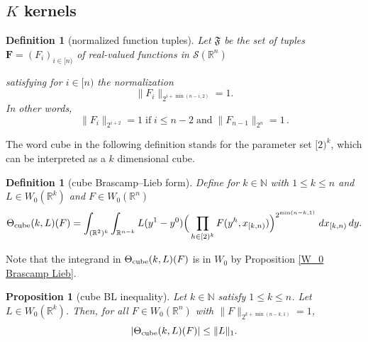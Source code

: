 \documentclass[12pt,reqno]{amsart}
\theoremstyle{plain}
\newtheorem{proposition}[theorem]{Proposition}
\newtheorem{definition}[theorem]{Definition}
\numberwithin{equation}{section}
\theoremstyle{remark}
\newcommand{\R}{{\mathbb R}}
\newcommand{\N}{{\mathbb N}}
\newcommand{\F}{\mathbf{F}}
\begin{document}
\subsection{\texorpdfstring{$K$ kernels}{K kernels}}


\begin{definition}[normalized function tuples]\label{normalized function tuples}
 Let $\mathfrak{F}$ be the set of tuples
$\F=(F_i)_{i\in [n)}$ of real-valued functions in $\mathcal{S}(\R^n)$


satisfying for $i\in [n)$ the normalization
 \begin{equation}\label{auto:normalized-function-tuple} \|F_{i}\|_{2^{i+\min(n-i,2)}}=1. \end{equation}
In other words,
 \begin{equation}\label{f-normalization}
  \|F_{i}\|_{2^{i+2}}=1\;\text{if}\;i\le n-2\;\text{and}\;\|F_{n-1}\|_{2^{n}}=1  \, .
 \end{equation}

\end{definition}


The word cube in the following definition stands for the parameter set $[2)^k$, which can be interpreted as a $k$ dimensional cube.

\begin{definition}[cube Brascamp--Lieb form]\label{cube Brascamp--Lieb}
Define for $k\in\N$ with $1 \le k\le  n$
and  $L\in W_0(\R^k)$ and $F\in W_0(\R^n)$
\begin{equation}\label{auto:cube-Brascamp-Lieb-form} \Theta_{{\rm cube}}(k,L)(F) = \int_{(\R^2)^k} \int_{\R^{n-k}} L(y^1-y^0) \Big(\prod_{h\in [2)^k} F(y^h, x_{[k,n)})\Big)^{2^{\min(n-k,1)}}\;dx_{[k,n)}\,dy.\end{equation}
\end{definition}
Note that the integrand in $\Theta_{{\rm cube}}(k, L)(F)$ is in $W_0$ by Proposition \ref{W_0 Brascamp Lieb}.


\begin{proposition}[cube BL inequality]\label{cube BL inequality}
Let $k\in\N$ satisfy $1 \le k\le n$.  Let $L\in W_0(\R^k)$. Then, for all $F\in W_0(\R^n)$ with $\|F\|_{2^{k+\min(n-k,1)}}=1$,
\begin{equation}\label{cube-k-m-bound}
   |\Theta_{\rm cube}(k,L)(F)| \le\|L\|_1 .
\end{equation}
\end{proposition}
\end{document}
